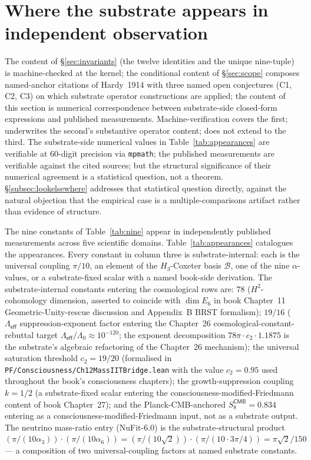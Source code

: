 \documentclass[11pt,a4paper]{amsart}
\theoremstyle{plain}
\theoremstyle{definition}
\begin{document}
\section{Where the substrate appears in independent observation}\label{sec:corroborations}

The content of \S\ref{sec:invariants} (the twelve identities and the unique nine-tuple) is machine-checked at the kernel; the conditional content of \S\ref{sec:scope} composes named-anchor citations of Hardy~1914 with three named open conjectures (C1, C2, C3) on which substrate operator constructions are applied; the content of this section is numerical correspondence between substrate-side closed-form expressions and published measurements. Machine-verification covers the first; underwrites the second's substantive operator content; does not extend to the third. The substrate-side numerical values in Table~\ref{tab:appearances} are verifiable at 60-digit precision via \texttt{mpmath}; the published measurements are verifiable against the cited sources; but the structural significance of their numerical agreement is a statistical question, not a theorem. \S\ref{subsec:lookelsewhere} addresses that statistical question directly, against the natural objection that the empirical case is a multiple-comparisons artifact rather than evidence of structure.

The nine constants of Table~\ref{tab:nine} appear in independently published measurements across five scientific domains. Table~\ref{tab:appearances} catalogues the appearances. Every constant in column three is substrate-internal: each is the universal coupling $\pi/10$, an element of the $H_3$-Coxeter basis $\mathcal{B}$, one of the nine $\alpha$-values, or a substrate-fixed scalar with a named book-side derivation. The substrate-internal constants entering the cosmological rows are: $78$ ($H^2$-cohomology dimension, asserted to coincide with $\dim E_6$ in book Chapter~11 Geometric-Unity-rescue discussion and Appendix~B BRST formalism); $19/16$ ($\Lambda_{\textsf{eff}}$ suppression-exponent factor entering the Chapter~26 cosmological-constant-rebuttal target $\Lambda_{\textsf{eff}}/\Lambda_0 \approx 10^{-120}$; the exponent decomposition $78\pi\cdot c_2\cdot 1.1875$ is the substrate's algebraic refactoring of the Chapter~26 mechanism); the universal saturation threshold $c_2 = 19/20$ (formalised in \texttt{PF/Consciousness/Ch12MassIITBridge.lean} with the value $c_2 = 0.95$ used throughout the book's consciousness chapters); the growth-suppression coupling $k = 1/2$ (a substrate-fixed scalar entering the consciousness-modified-Friedmann content of book Chapter~27); and the Planck-CMB-anchored $S_8^{\textsf{CMB}} = 0.834$ entering as a consciousness-modified-Friedmann input, not as a substrate output. The neutrino mass-ratio entry (NuFit-6.0) is the substrate-structural product $(\pi/(10\alpha_3))\cdot(\pi/(10\alpha_6)) = (\pi/(10\sqrt{2}))\cdot(\pi/(10\cdot 3\pi/4)) = \pi\sqrt{2}/150$ --- a composition of two universal-coupling factors at named substrate constants.
\end{document}
